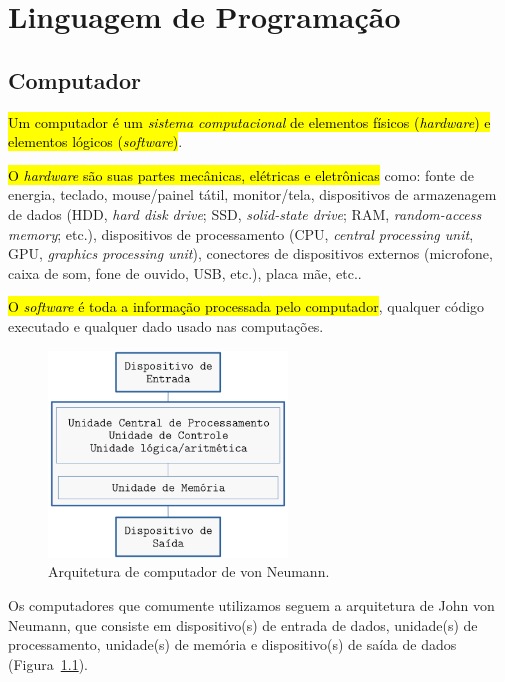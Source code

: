 \chapter{Linguagem de Programação}\label{cap_lingua}

\section{Computador}\label{cap_lim_sec_computador}

\hl{Um computador é um \emph{sistema computacional} de elementos físicos (\emph{hardware}) e elementos lógicos (\emph{software})}.

\hl{O \emph{hardware} são suas partes mecânicas, elétricas e eletrônicas} como: fonte de energia, teclado, mouse/painel tátil, monitor/tela, dispositivos de armazenagem de dados (HDD, \textit{hard disk drive}; SSD, \textit{solid-state drive}; RAM, \textit{random-access memory}; etc.), dispositivos de processamento (CPU, \textit{central processing unit}, GPU, \textit{graphics processing unit}), conectores de dispositivos externos (microfone, caixa de som, fone de ouvido, USB, etc.), placa mãe, etc..

\hl{O \emph{software} é toda a informação processada pelo computador}, qualquer código executado e qualquer dado usado nas computações.

\begin{figure}[htb]
  \centering
  \includegraphics[width=2.5in]{./cap_lingua/dados/fig_arqVonNeumann/fig.png}
  \caption[Arquitetura de von Neumann]{Arquitetura de computador de von Neumann.}
  \label{cap_lim_sec_computador:fig:arqVonNeumann}
\end{figure}

Os computadores que comumente utilizamos seguem a arquitetura de John von Neumann{\vonNeumann}, que consiste em dispositivo(s) de entrada de dados, unidade(s) de processamento, unidade(s) de memória e dispositivo(s) de saída de dados (Figura~\ref{cap_lim_sec_computador:fig:arqVonNeumann}).

